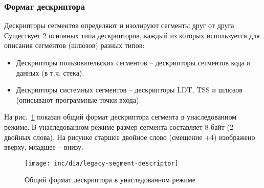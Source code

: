 \subsubsection*{Формат дескриптора}
Дескрипторы сегментов определяют и изолируют сегменты друг от друга. Существует 2 основных типа
дескрипторов, каждый из которых используется для описания сегментов (шлюзов) разных типов:
\begin{itemize}
	\item Дескрипторы пользовательских сегментов -- дескрипторы сегментов кода и данных (в т.ч. стека).
	\item Дескрипторы системных сегментов -- дескрипторы LDT, TSS и шлюзов (описывают программные точки входа).
\end{itemize}

На рис.~\ref{fig:legacy-segment-descriptor-format} показан общий формат дескриптора сегмента в унаследованном режиме.
В унаследованном режиме размер сегмента составляет 8 байт (2 двойных слова). На рисунке старшее двойное слово (смещение +4)
изображено вверху, младшее -- внизу.

\begin{figure}[ht!]
  \centering
  \texttt{[image: inc/dia/legacy-segment-descriptor]}
  \caption{Общий формат дескриптора в унаследованном режиме}
  \label{fig:legacy-segment-descriptor-format}
\end{figure}

